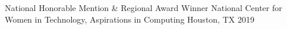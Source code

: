 
\begin{cvhonors}

  \cvhonor
    {National Honorable Mention \& Regional Award Winner} %
    {National Center for Women in Technology, Aspirations in Computing} %
    {Houston, TX} %
    {2019} %

\end{cvhonors}
